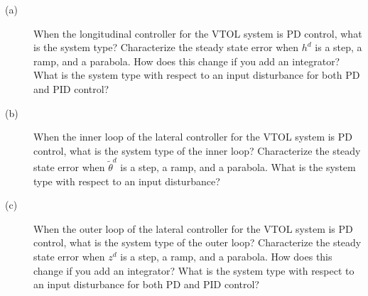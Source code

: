 \begin{description}
\item[(a)] When the longitudinal controller for the VTOL system is PD control, what is the system type? Characterize the steady state error when $h^d$ is a step, a ramp, and a parabola.  How does this change if you add an integrator?  What is the system type with respect to an input disturbance for both PD and PID control? 
\item[(b)] When the inner loop of the lateral controller for the VTOL system is PD control, what is the system type of the inner loop?  Characterize the steady state error when $\tilde{\theta}^d$ is a step, a ramp, and a parabola.  What is the system type with respect to an input disturbance?
\item[(c)] When the outer loop of the lateral controller for the VTOL system is PD control, what is the system type of the outer loop?  Characterize the steady state error when $z^d$ is a step, a ramp, and a parabola.  How does this change if you add an integrator?  What is the system type with respect to an input disturbance for both PD and PID control? 
\end{description}
